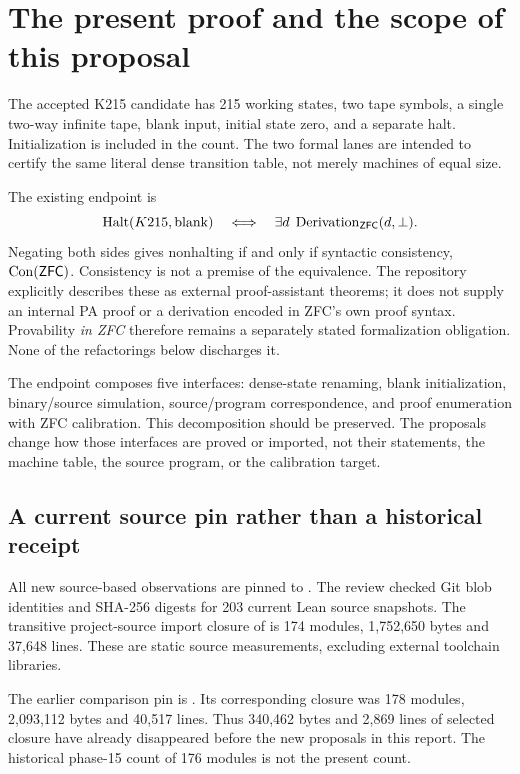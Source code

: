 \section{The present proof and the scope of this proposal}
\label{sec:baseline}
The accepted K215 candidate has 215 working states, two tape symbols, a single two-way infinite tape, blank input, initial state zero, and a separate halt. Initialization is included in the count. The two formal lanes are intended to certify the same literal dense transition table, not merely machines of equal size.

The existing endpoint is
\[
  \operatorname{Halt}(K215,\operatorname{blank})
  \quad\Longleftrightarrow\quad
  \exists d\;\operatorname{Derivation}_{\mathsf{ZFC}}(d,\bot).
\]
Negating both sides gives nonhalting if and only if syntactic consistency, $\operatorname{Con}(\mathsf{ZFC})$. Consistency is not a premise of the equivalence. The repository explicitly describes these as external proof-assistant theorems; it does not supply an internal PA proof or a derivation encoded in ZFC's own proof syntax. Provability \emph{in ZFC} therefore remains a separately stated formalization obligation. None of the refactorings below discharges it.

The endpoint composes five interfaces: dense-state renaming, blank initialization, binary/source simulation, source/program correspondence, and proof enumeration with ZFC calibration. This decomposition should be preserved. The proposals change how those interfaces are proved or imported, not their statements, the machine table, the source program, or the calibration target.

\subsection{A current source pin rather than a historical receipt}
All new source-based observations are pinned to \pin. The review checked Git blob identities and SHA-256 digests for 203 current Lean source snapshots. The transitive project-source import closure of  is 174 modules, 1,752,650 bytes and 37,648 lines. These are static source measurements, excluding external toolchain libraries.

The earlier comparison pin is
. Its corresponding closure was 178 modules, 2,093,112 bytes and 40,517 lines. Thus 340,462 bytes and 2,869 lines of selected closure have already disappeared before the new proposals in this report. The historical phase-15 count of 176 modules is not the present count.

